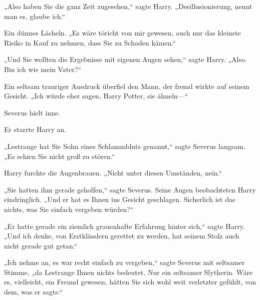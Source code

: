 „Also haben Sie die ganz Zeit zugesehen,“ sagte Harry. „Desillusionierung, nennt man es, glaube ich.“

Ein dünnes Lächeln. „Es wäre töricht von mir gewesen, auch nur das kleinste Risiko in Kauf zu nehmen, dass Sie zu Schaden kämen.“

„Und Sie wollten die Ergebnisse mit eigenen Augen sehen,“ sagte Harry. „Also. Bin ich wie mein Vater?“

Ein seltsam trauriger Ausdruck überfiel den Mann, der fremd wirkte auf seinem Gesicht. „Ich würde eher sagen, Harry Potter, sie ähneln—“

Severus hielt inne.

Er starrte Harry an.

„Lestrange hat Sie Sohn eines Schlammbluts genannt,“ sagte Severus langsam. „Es schien Sie nicht groß zu stören.“

Harry furchte die Augenbrauen. „Nicht unter diesen Umständen, nein.“

„Sie hatten ihm gerade geholfen,“ sagte Severus. Seine Augen beobachteten Harry eindringlich. „Und er hat es Ihnen ins Gesicht geschlagen. Sicherlich ist das nichts, was Sie einfach vergeben würden?“

„Er hatte gerade ein ziemlich grauenhafte Erfahrung hinter sich,“ sagte Harry. „Und ich denke, von Erstklässlern gerettet zu werden, hat seinem Stolz auch nicht gerade gut getan.“

„Ich nehme an, es war recht einfach zu vergeben,“ sagte Severus mit seltsamer Stimme, „da Lestrange Ihnen nichts bedeutet. Nur ein seltsamer Slytherin. Wäre es, vielleicht, ein Freund gewesen, hätten Sie sich wohl weit verletzter gefühlt, von dem, was er sagte.“

